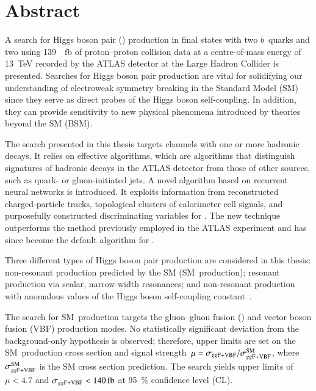 \chapter*{Abstract}

A search for Higgs boson pair (\HH) production in final states with two
$b$~quarks and two \tauleptons using \SI{139}{\per\femto\barn} of proton--proton
collision data at a centre-of-mass energy of \SI{13}{\TeV} recorded by the ATLAS
detector at the Large Hadron Collider is presented. Searches for Higgs boson
pair production are vital for solidifying our understanding of electroweak
symmetry breaking in the Standard Model (SM) since they serve as direct probes
of the Higgs boson self-coupling. In addition, they can provide sensitivity to
new physical phenomena introduced by theories beyond the SM (BSM).

The search presented in this thesis targets channels with one or more hadronic
\tauleptonC decays. It relies on effective \tauid algorithms, which are
algorithms that distinguish signatures of hadronic \tauleptonC decays in the
ATLAS detector from those of other sources, such as quark- or gluon-initiated
jets. A novel \tauid algorithm based on recurrent neural networks is
introduced. It exploits information from reconstructed charged-particle tracks,
topological clusters of calorimeter cell signals, and purposefully constructed
discriminating variables for \tauid. The new technique outperforms the method
previously employed in the ATLAS experiment and has since become the default
algorithm for \tauid.

Three different types of Higgs boson pair production are considered in this
thesis: non-resonant \HH production predicted by the SM (SM~\HH production);
resonant \HH production via scalar, narrow-width resonances; and non-resonant
\HH production with anomalous values of the Higgs boson self-coupling
constant~\lambdahhh.

The search for SM~\HH production targets the gluon--gluon fusion (\ggF) and
vector boson fusion (VBF) production modes. No statistically significant
deviation from the background-only hypothesis is observed; therefore, upper
limits are set on the SM~\HH production cross section \xsecggfvbf and signal
strength~$\mu = \sigma_{gg\text{F+VBF}} / \sigma_{gg\text{F+VBF}}^{\text{SM}}$, where
$\sigma_{gg\text{F+VBF}}^{\text{SM}}$ is the SM cross section prediction. The search yields
upper limits of $\mu < \num{4.7}$ and $\xsecggfvbf < \SI{140}{\femto\barn}$ at
\SI{95}{\percent} confidence level (CL).

